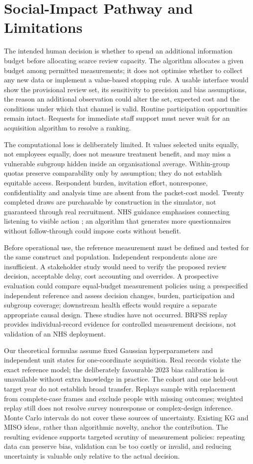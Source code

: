 \section{Social-Impact Pathway and Limitations}
The intended human decision is whether to spend an additional information budget before allocating scarce review capacity. The algorithm allocates a given budget among permitted measurements; it does not optimise whether to collect any new data or implement a value-based stopping rule. A usable interface would show the provisional review set, its sensitivity to precision and bias assumptions, the reason an additional observation could alter the set, expected cost and the conditions under which that channel is valid. Routine participation opportunities remain intact. Requests for immediate staff support must never wait for an acquisition algorithm to resolve a ranking.

The computational loss is deliberately limited. It values selected units equally, not employees equally, does not measure treatment benefit, and may miss a vulnerable subgroup hidden inside an organisational average. Within-group quotas preserve comparability only by assumption; they do not establish equitable access. Respondent burden, invitation effort, nonresponse, confidentiality and analysis time are absent from the packet-cost model. Twenty completed draws are purchasable by construction in the simulator, not guaranteed through real recruitment. NHS guidance emphasises connecting listening to visible action \citep{dom_listeningwell2023}; an algorithm that generates more questionnaires without follow-through could impose costs without benefit.

Before operational use, the reference measurement must be defined and tested for the same construct and population. Independent respondents alone are insufficient. A stakeholder study would need to verify the proposed review decision, acceptable delay, cost accounting and overrides. A prospective evaluation could compare equal-budget measurement policies using a prespecified independent reference and assess decision changes, burden, participation and subgroup coverage; downstream health effects would require a separate appropriate causal design. These studies have not occurred. BRFSS replay provides individual-record evidence for controlled measurement decisions, not validation of an NHS deployment.

Our theoretical formulas assume fixed Gaussian hyperparameters and independent unit states for one-coordinate acquisition. Real records violate the exact reference model; the deliberately favourable 2023 bias calibration is unavailable without extra knowledge in practice. The cohort and one held-out target year do not establish broad transfer. Replays sample with replacement from complete-case frames and exclude people with missing outcomes; weighted replay still does not resolve survey nonresponse or complex-design inference. Monte Carlo intervals do not cover these sources of uncertainty. Existing KG and MISO ideas, rather than algorithmic novelty, anchor the contribution. The resulting evidence supports targeted scrutiny of measurement policies: repeating data can preserve bias, validation can be too costly or invalid, and reducing uncertainty is valuable only relative to the actual decision.

